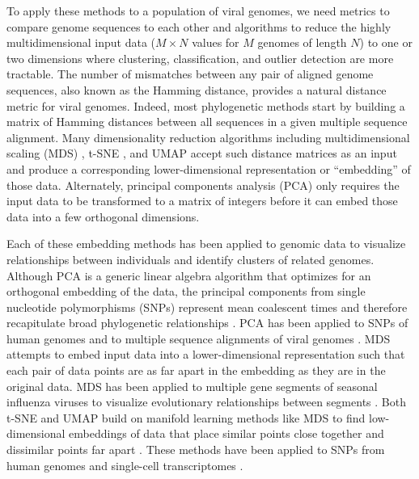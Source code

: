 \documentclass[9pt,lineno]{elife}
\begin{document}
To apply these methods to a population of viral genomes, we need metrics to compare genome sequences to each other and algorithms to reduce the highly multidimensional input data ($M \times N$ values for $M$ genomes of length $N$) to one or two dimensions where clustering, classification, and outlier detection are more tractable.
The number of mismatches between any pair of aligned genome sequences, also known as the Hamming distance, provides a natural distance metric for viral genomes.
Indeed, most phylogenetic methods start by building a matrix of Hamming distances between all sequences in a given multiple sequence alignment.
Many dimensionality reduction algorithms including multidimensional scaling (MDS) \citep{hout_papesh_goldinger_2012}, t-SNE \citep{maaten2008visualizing}, and UMAP \citep{lel2018umap} accept such distance matrices as an input and produce a corresponding lower-dimensional representation or “embedding” of those data.
Alternately, principal components analysis (PCA) only requires the input data to be transformed to a matrix of integers before it can embed those data into a few orthogonal dimensions.

Each of these embedding methods has been applied to genomic data to visualize relationships between individuals and identify clusters of related genomes.
Although PCA is a generic linear algebra algorithm that optimizes for an orthogonal embedding of the data, the principal components from single nucleotide polymorphisms (SNPs) represent mean coalescent times and therefore recapitulate broad phylogenetic relationships \citep{mcvean_2009}.
PCA has been applied to SNPs of human genomes \citep{novembre_2008,alexander_2009,mcvean_2009,auton_2015} and to multiple sequence alignments of viral genomes \citep{metsky_2017}.
MDS attempts to embed input data into a lower-dimensional representation such that each pair of data points are as far apart in the embedding as they are in the original data.
MDS has been applied to multiple gene segments of seasonal influenza viruses to visualize evolutionary relationships between segments \citep{rambaut_2008}.
Both t-SNE and UMAP build on manifold learning methods like MDS to find low-dimensional embeddings of data that place similar points close together and dissimilar points far apart \citep{kobak_2021}.
These methods have been applied to SNPs from human genomes \citep{diaz-papkovich_2019} and single-cell transcriptomes \citep{becht_2018,kobak_2019}.
\end{document}
